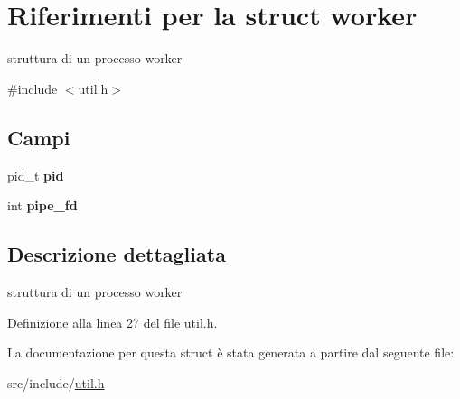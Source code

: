 \hypertarget{structworker}{}\section{Riferimenti per la struct worker}
\label{structworker}


struttura di un processo worker  




{\ttfamily \#include $<$util.\+h$>$}

\subsection*{Campi}
\begin{DoxyCompactItemize}
\item 
\mbox{\label{structworker_ac2e70e5d41675e3a7a1550afa9b9f0c0}} 
pid\+\_\+t {\bfseries pid}
\item 
\mbox{\label{structworker_a3fcadbbae143f88749e5c6fac792ef6b}} 
int {\bfseries pipe\+\_\+fd}
\end{DoxyCompactItemize}


\subsection{Descrizione dettagliata}
struttura di un processo worker 

Definizione alla linea 27 del file util.\+h.



La documentazione per questa struct è stata generata a partire dal seguente file\+:\begin{DoxyCompactItemize}
\item 
src/include/\hyperlink{util_8h}{util.\+h}\end{DoxyCompactItemize}
